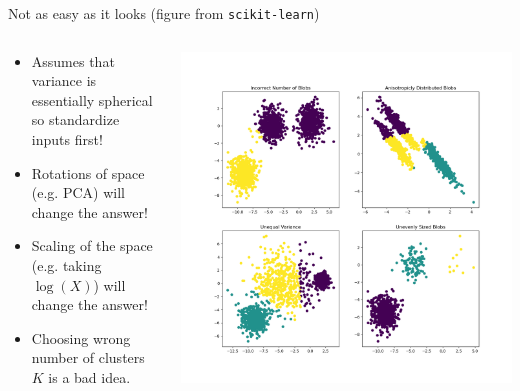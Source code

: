 \documentclass[xcolor=pdftex,dvipsnames,table,mathserif,aspectratio=169]{beamer}
\begin{document}
\begin{frame}{Not as easy as it looks (figure from \texttt{scikit-learn})}

\begin{columns}
\begin{column}{0.5\textwidth}
  \begin{itemize}
\item Assumes that variance is essentially \alert{spherical} so standardize inputs first!
\item Rotations of space (e.g. PCA) will change the answer!
\item Scaling of the space (e.g. taking $\log(X)$) will change the answer!
\item Choosing wrong number of clusters $K$ is a bad idea.
  \end{itemize}
\end{column}
\begin{column}{0.5\textwidth}  %
    \begin{center}
\includegraphics[height=0.9\textheight]{./resources/scikit_learn.png}
     \end{center}
\end{column}
\end{columns}
\end{frame}
\end{document}
